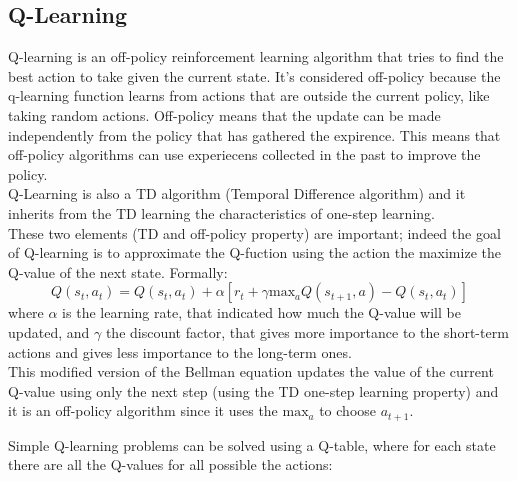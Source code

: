 \documentclass[14pt]{extarticle}
\def\sp{\vspace{5pt}}
\def\ppn{\vspace{10pt}}
\begin{document}
\begin{flushleft}
\subsection{Q-Learning}
\sp
Q-learning is an off-policy reinforcement learning algorithm that tries to find the best action to take given the current state. It's considered off-policy because the q-learning function learns from actions that are outside the current policy, like taking random actions. Off-policy means that the update can be made independently from the policy that has gathered the expirence. This means that off-policy algorithms can use experiecens collected in the past to improve the policy.\\
Q-Learning is also a TD algorithm (Temporal Difference algorithm\cite{TDl}) and it inherits from the TD learning the characteristics of one-step learning.\\
These two elements (TD and off-policy property) are important; indeed the goal of Q-learning is to approximate the Q-fuction using the action the maximize the Q-value of the next state. Formally:
\begin{equation} \label{eq:2}
 Q(s_t,a_t) = Q(s_t,a_t) + 
\alpha[r_t + \gamma \text{max}_{a}Q(s_{t+1},a) - Q(s_t,a_t)] 
\end{equation}
where $\alpha$ is the learning rate, that indicated how much the Q-value will be updated, and $\gamma$ the discount factor, that gives more importance to the short-term actions and gives less importance to the long-term ones. \\
This modified version of the Bellman equation updates the value of the current Q-value using only the next step (using the TD one-step learning property) and it is an off-policy 
algorithm since it uses the $\text{max}_{a}$ to choose $a_{t+1}$.

\ppn
Simple Q-learning problems can be solved using a Q-table, where for each state there are all the Q-values for all possible the actions:


\end{flushleft}
\end{document}
